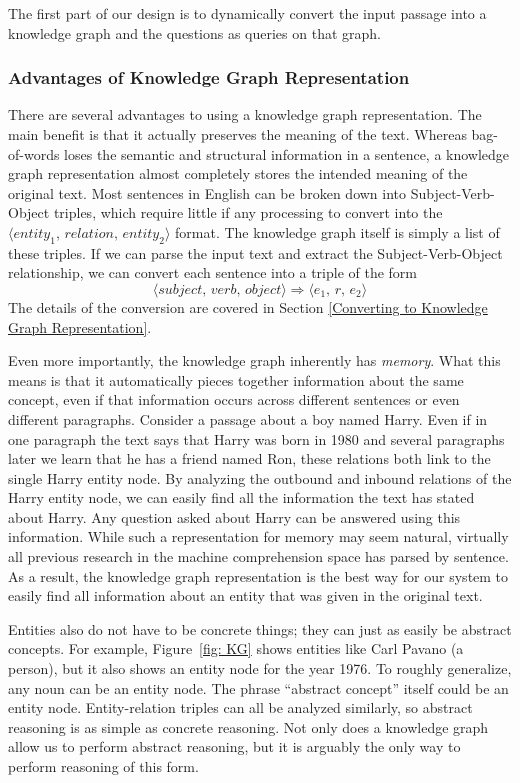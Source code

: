 \documentclass[pageno]{final_paper}
\begin{document}
The first part of our design is to dynamically convert the input passage into a
knowledge graph and the questions as queries on that graph.

\subsubsection{Advantages of Knowledge Graph Representation}
\label{Advantages of Knowledge Graph Representation}

There are several advantages to using a knowledge graph representation. The main
benefit is that it actually preserves the meaning of the text. Whereas
bag-of-words loses the semantic and structural information in a sentence, a
knowledge graph representation almost completely stores the intended meaning of
the original text. Most sentences in English can be broken down into
Subject-Verb-Object triples, which require little if any processing to convert
into the $\langle \textit{entity}_1, \, \textit{relation}, \, \textit{entity}_2
\rangle$ format. The knowledge graph itself is simply a list of these triples.
If we can parse the input text and extract the Subject-Verb-Object relationship,
we can convert each sentence into a triple of the form
$$\langle \textit{subject}, \, \textit{verb}, \, \textit{object} \rangle
\Rightarrow \langle e_1, \, r, \, e_2 \rangle$$
The details of the conversion are covered in Section \ref{Converting to
Knowledge Graph Representation}.

Even more importantly, the knowledge graph inherently has \textit{memory}. What
this means is that it automatically pieces together information about the same
concept, even if that information occurs across different sentences or even
different paragraphs. Consider a passage about a boy named Harry. Even if in one
paragraph the text says that Harry was born in 1980 and several paragraphs later
we learn that he has a friend named Ron, these relations both link to the single
Harry entity node. By analyzing the outbound and inbound relations of the Harry
entity node, we can easily find all the information the text has stated about
Harry. Any question asked about Harry can be answered using this information.
While such a representation for memory may seem natural, virtually all previous
research in the machine comprehension space has parsed by sentence. As a result,
the knowledge graph representation is the best way for our system to easily find
all information about an entity that was given in the original text.

Entities also do not have to be concrete things; they can just as easily be
abstract concepts. For example, Figure~\ref{fig: KG} shows entities like Carl
Pavano (a person), but it also shows an entity node for the year 1976. To
roughly generalize, any noun can be an entity node. The phrase ``abstract
concept'' itself could be an entity node. Entity-relation triples can all be
analyzed similarly, so abstract reasoning is as simple as concrete reasoning.
Not only does a knowledge graph allow us to perform abstract reasoning, but it
is arguably the only way to perform reasoning of this form.
\end{document}
